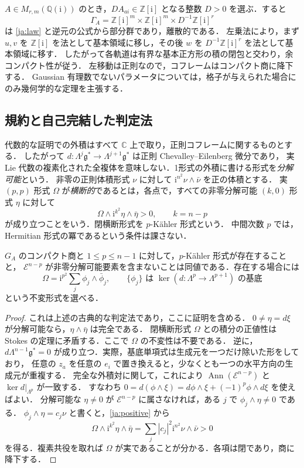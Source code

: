 \documentclass[12pt]{amsart}
\theoremstyle{definition}
\theoremstyle{remark}
\numberwithin{equation}{section}
\newcommand{\Z}{\mathbb{Z}}
\newcommand{\C}{\mathbb{C}}
\newcommand{\Q}{\mathbb{Q}}
\newcommand{\gfr}{\mathfrak g}
\newcommand{\Eex}{\mathcal E}
\newcommand{\Ann}{\operatorname{Ann}}
\newcommand{\ii}{\mathrm i}
\begin{document}
$A\in M_{r,m}(\Q(\ii))$ のとき，$DA_{ai}\in\Z[\ii]$ となる整数 $D>0$ を選ぶ．すると
\begin{equation}\label{ja:lattice}
 \Gamma_A=\Z[\ii]^m\times\Z[\ii]^m\times D^{-1}\Z[\ii]^r
\end{equation}
は \eqref{ja:law} と逆元の公式から部分群であり，離散的である．
左乗法により，まず $u,v$ を $\Z[\ii]$ を法として基本領域に移し，その後 $w$ を $D^{-1}\Z[\ii]^r$ を法として基本領域に移す．
したがって各軌道は有界な基本正方形の積の閉包と交わり，余コンパクト性が従う．
左移動は正則なので，コフレームはコンパクト商に降下する．
Gaussian 有理数でないパラメータについては，格子が与えられた場合にのみ幾何学的な定理を主張する．

\subsection{規約と自己完結した判定法}
代数的な証明での外積はすべて $\C$ 上で取り，正則コフレームに関するものとする．
したがって $d:\Lambda^j\gfr^*\to\Lambda^{j+1}\gfr^*$ は正則 Chevalley--Eilenberg 微分であり，
実 Lie 代数の複素化された全複体を意味しない．1形式の外積に書ける形式を\emph{分解可能}という．
非零の正則体積形式 $\nu$ に対して $\ii^{n^2}\nu\wedge\bar\nu$ を正の体積とする．
実 $(p,p)$ 形式 $\Omega$ が\emph{横断的}であるとは，各点で，すべての非零分解可能 $(k,0)$ 形式 $\eta$ に対して
\[
 \Omega\wedge\ii^{k^2}\eta\wedge\bar\eta>0,
 \qquad k=n-p
\]
が成り立つことをいう．閉横断形式を $p$-K\"ahler 形式という．
中間次数 $p$ では，Hermitian 形式の冪であるという条件は課さない．

\begin{jlem}[完全形式による判定]\label{ja:criterion}
$G_A$ のコンパクト商と $1\leq p\leq n-1$ に対して，$p$-K\"ahler 形式が存在することと，
$\Eex^{n-p}$ が非零分解可能要素を含まないことは同値である．存在する場合には
\begin{equation}\label{ja:positive}
 \Omega=\ii^{p^2}\sum_j\phi_j\wedge\bar\phi_j,
 \qquad \{\phi_j\}\text{ は }\ker(d:\Lambda^p\to\Lambda^{p+1})\text{ の基底}
\end{equation}
という不変形式を選べる．
\end{jlem}
\begin{proof}
これは上述の古典的な判定法であり，ここに証明を含める．
$0\ne\eta=d\xi$ が分解可能なら，$\eta\wedge\bar\eta$ は完全である．
閉横断形式 $\Omega$ との積分の正値性は Stokes の定理に矛盾する．ここで $\Omega$ の不変性は不要である．
逆に，$d\Lambda^{n-1}\gfr^*=0$ が成り立つ．実際，基底単項式は生成元を一つだけ除いた形をしており，
任意の $z_a$ を任意の $e_i$ で置き換えると，少なくとも一つの水平方向の生成元が重複する．
完全な外積対に関して，これにより $\Ann(\Eex^{n-p})$ と $\ker d|_{\Lambda^p}$ が一致する．
すなわち $0=d(\phi\wedge\xi)=d\phi\wedge\xi+(-1)^p\phi\wedge d\xi$ を使えばよい．
分解可能な $\eta\ne0$ が $\Eex^{n-p}$ に属さなければ，ある $j$ で $\phi_j\wedge\eta\ne0$ である．
$\phi_j\wedge\eta=c_j\nu$ と書くと，\eqref{ja:positive} から
\[
 \Omega\wedge\ii^{k^2}\eta\wedge\bar\eta
 =\sum_j|c_j|^2\ii^{n^2}\nu\wedge\bar\nu>0
\]
を得る．複素共役を取れば $\Omega$ が実であることが分かる．各項は閉であり，商に降下する．
\end{proof}
\end{document}

